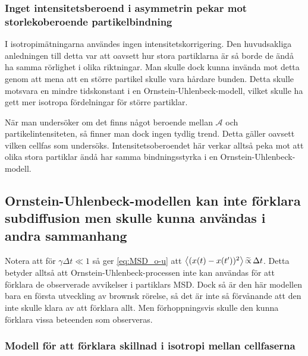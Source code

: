 \subsubsection{Inget intensitetsberoend i asymmetrin pekar mot storlekoberoende partikelbindning}
I isotropimätningarna användes ingen intensitetskorrigering. Den huvudsakliga anledningen till detta var att oavsett hur stora partiklarna är så borde de ändå ha samma rörlighet i olika riktningar. Man skulle dock kunna invända mot detta genom att mena att en större partikel skulle vara hårdare bunden. Detta skulle motsvara en mindre tidskonstant i en Ornstein-Uhlenbeck-modell, vilket skulle ha gett mer isotropa fördelningar för större partiklar.

När man undersöker om det finns något beroende mellan $\mathcal{A}$ och partikelintensiteten, så finner man dock ingen tydlig trend. Detta gäller oavsett vilken cellfas som undersöks.
Intensitetsoberoendet här verkar alltså peka mot att olika stora partiklar ändå har samma bindningsstyrka i en Ornstein-Uhlenbeck-modell. 







\subsection{Ornstein-Uhlenbeck-modellen kan inte förklara subdiffusion men skulle kunna användas i andra sammanhang}

Notera att för $\gamma\Delta{t}\ll 1$ så ger \eqref{eq:MSD_o-u} att $\ev{(x(t)-x(t') )^2}\widetilde{\propto}\,\Delta{t}$. Detta betyder alltså att Ornstein-Uhlenbeck-processen inte kan användas för att förklara de observerade avvikelser i partiklars MSD. Dock så är den här modellen bara en första utveckling av brownsk rörelse, så det är inte så förvånande att den inte skulle klara av att förklara allt. Men förhoppningsvis skulle den kunna förklara vissa beteenden som observeras. 


\subsubsection{Modell för att förklara skillnad i isotropi mellan cellfaserna}

